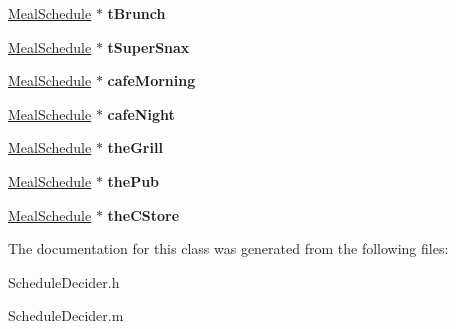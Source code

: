 \begin{DoxyCompactItemize}
\item 
\hypertarget{interface_schedule_decider_ac1bf7d6a342c76e50af54e3247a519ee}{
\hyperlink{interface_meal_schedule}{MealSchedule} $\ast$ {\bfseries tBrunch}}
\label{interface_schedule_decider_ac1bf7d6a342c76e50af54e3247a519ee}

\item 
\hypertarget{interface_schedule_decider_a210b9b8d128ca900980bd6db7d4a6530}{
\hyperlink{interface_meal_schedule}{MealSchedule} $\ast$ {\bfseries tSuperSnax}}
\label{interface_schedule_decider_a210b9b8d128ca900980bd6db7d4a6530}

\item 
\hypertarget{interface_schedule_decider_a75cdf66fa988a5d8dd9877ca95bb5457}{
\hyperlink{interface_meal_schedule}{MealSchedule} $\ast$ {\bfseries cafeMorning}}
\label{interface_schedule_decider_a75cdf66fa988a5d8dd9877ca95bb5457}

\item 
\hypertarget{interface_schedule_decider_a20205907ebcbc7085996f44c880b6150}{
\hyperlink{interface_meal_schedule}{MealSchedule} $\ast$ {\bfseries cafeNight}}
\label{interface_schedule_decider_a20205907ebcbc7085996f44c880b6150}

\item 
\hypertarget{interface_schedule_decider_a984cde06ca99dcc6004de4c611773d80}{
\hyperlink{interface_meal_schedule}{MealSchedule} $\ast$ {\bfseries theGrill}}
\label{interface_schedule_decider_a984cde06ca99dcc6004de4c611773d80}

\item 
\hypertarget{interface_schedule_decider_a3a6bd7d07bcc7edf8ffa554afa7ac0c0}{
\hyperlink{interface_meal_schedule}{MealSchedule} $\ast$ {\bfseries thePub}}
\label{interface_schedule_decider_a3a6bd7d07bcc7edf8ffa554afa7ac0c0}

\item 
\hypertarget{interface_schedule_decider_a6ae4fc2b06420cfce7b771f3090de804}{
\hyperlink{interface_meal_schedule}{MealSchedule} $\ast$ {\bfseries theCStore}}
\label{interface_schedule_decider_a6ae4fc2b06420cfce7b771f3090de804}

\end{DoxyCompactItemize}


The documentation for this class was generated from the following files:\begin{DoxyCompactItemize}
\item 
ScheduleDecider.h\item 
ScheduleDecider.m\end{DoxyCompactItemize}
